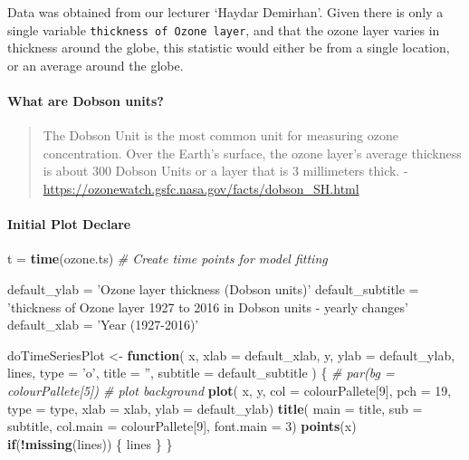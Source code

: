 \documentclass[]{article}
\newenvironment{Shaded}{\begin{snugshade}}{\end{snugshade}}
\newcommand{\CommentTok}[1]{\textcolor[rgb]{0.56,0.35,0.01}{\textit{#1}}}
\newcommand{\ControlFlowTok}[1]{\textcolor[rgb]{0.13,0.29,0.53}{\textbf{#1}}}
\newcommand{\DataTypeTok}[1]{\textcolor[rgb]{0.13,0.29,0.53}{#1}}
\newcommand{\DecValTok}[1]{\textcolor[rgb]{0.00,0.00,0.81}{#1}}
\newcommand{\KeywordTok}[1]{\textcolor[rgb]{0.13,0.29,0.53}{\textbf{#1}}}
\newcommand{\NormalTok}[1]{#1}
\newcommand{\OperatorTok}[1]{\textcolor[rgb]{0.81,0.36,0.00}{\textbf{#1}}}
\newcommand{\StringTok}[1]{\textcolor[rgb]{0.31,0.60,0.02}{#1}}
\let\oldparagraph\paragraph
\renewcommand{\paragraph}[1]{\oldparagraph{#1}\mbox{}}
\begin{document}
Data was obtained from our lecturer `Haydar Demirhan'. Given there is
only a single variable \texttt{thickness\ of\ Ozone\ layer}, and that
the ozone layer varies in thickness around the globe, this statistic
would either be from a single location, or an average around the globe.

\hypertarget{what-are-dobson-units}{%
\paragraph{What are Dobson units?}\label{what-are-dobson-units}}

\begin{quote}
The Dobson Unit is the most common unit for measuring ozone
concentration. Over the Earth's surface, the ozone layer's average
thickness is about 300 Dobson Units or a layer that is 3 millimeters
thick. - \url{https://ozonewatch.gsfc.nasa.gov/facts/dobson_SH.html}
\end{quote}

\hypertarget{initial-plot-declare}{%
\paragraph{Initial Plot Declare}\label{initial-plot-declare}}

\begin{Shaded}
\begin{Highlighting}[]
\NormalTok{t =}\StringTok{ }\KeywordTok{time}\NormalTok{(ozone.ts) }\CommentTok{# Create time points for model fitting}

\NormalTok{default_ylab =}\StringTok{ 'Ozone layer thickness (Dobson units)'}
\NormalTok{default_subtitle =}\StringTok{ 'thickness of Ozone layer 1927 to 2016 in Dobson units - yearly changes'}
\NormalTok{default_xlab =}\StringTok{ 'Year (1927-2016)'}

\NormalTok{doTimeSeriesPlot <-}\StringTok{ }\ControlFlowTok{function}\NormalTok{(}
\NormalTok{  x, }
  \DataTypeTok{xlab =}\NormalTok{ default_xlab,}
\NormalTok{  y,}
  \DataTypeTok{ylab =}\NormalTok{ default_ylab,}
\NormalTok{  lines,}
  \DataTypeTok{type =} \StringTok{'o'}\NormalTok{, }
  \DataTypeTok{title =} \StringTok{''}\NormalTok{,}
  \DataTypeTok{subtitle =}\NormalTok{ default_subtitle}
\NormalTok{  ) \{}
  \CommentTok{# par(bg = colourPallete[5]) # plot background}
  \KeywordTok{plot}\NormalTok{( }
\NormalTok{    x,}
\NormalTok{    y,}
    \DataTypeTok{col =}\NormalTok{ colourPallete[}\DecValTok{9}\NormalTok{],}
    \DataTypeTok{pch =} \DecValTok{19}\NormalTok{,}
    \DataTypeTok{type =}\NormalTok{ type,}
    \DataTypeTok{xlab =}\NormalTok{ xlab,}
    \DataTypeTok{ylab =}\NormalTok{ default_ylab)}
  \KeywordTok{title}\NormalTok{(}
    \DataTypeTok{main =}\NormalTok{ title,}
    \DataTypeTok{sub =}\NormalTok{ subtitle,}
    \DataTypeTok{col.main =}\NormalTok{ colourPallete[}\DecValTok{9}\NormalTok{],}
    \DataTypeTok{font.main =} \DecValTok{3}\NormalTok{)}
  \KeywordTok{points}\NormalTok{(x)}
  \ControlFlowTok{if}\NormalTok{(}\OperatorTok{!}\KeywordTok{missing}\NormalTok{(lines)) \{ lines \}}
\NormalTok{\}}
\end{Highlighting}
\end{Shaded}
\end{document}
